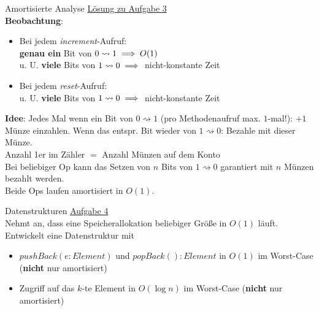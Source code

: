 \begin{frame}{Amortisierte Analyse}
	\underline{Lösung zu Aufgabe 3} \\
	\textbf{Beobachtung}: 
	\begin{itemize}
		\item Bei jedem \emph{increment}-Aufruf: \\
			  \textbf{genau ein} Bit von $0 \rightsquigarrow 1 \Impl O(1)$ \\
			  u. U. \textbf{viele} Bits von $1 \rightsquigarrow 0 \Impl$ nicht-konstante Zeit
		\pause
		\item Bei jedem \emph{reset}-Aufruf: \\
			  u. U. \textbf{viele} Bits von $1 \rightsquigarrow 0 \Impl$ nicht-konstante Zeit
	\end{itemize}
	\pause
	\textbf{Idee}: Jedes Mal wenn ein Bit von $0 \rightsquigarrow 1$ (pro Methodenaufruf max. $1$-mal!): $+1$ Münze einzahlen. Wenn das entspr. Bit wieder von $1 \rightsquigarrow 0$: Bezahle mit dieser Münze. \\
	\pause
	\impl Anzahl 1er im Zähler $=$ Anzahl Münzen auf dem Konto \\
	\pause
	\impl Bei beliebiger Op kann das Setzen von $n$ Bits von $1 \rightsquigarrow 0$ garantiert mit $n$ Münzen bezahlt werden. \\
	\pause
	\impl Beide Ops laufen amortisiert in $O(1)$.
\end{frame}



\begin{frame}{Datenstrukturen}
	\underline{Aufgabe 4} \\
	Nehmt an, dass eine Speicherallokation beliebiger Größe in $O(1)$ läuft. Entwickelt eine Datenstruktur mit
	\begin{itemize}
		\item $pushBack(e : Element)$ und $popBack() : Element$ in $O(1)$ im Worst-Case (\textbf{nicht} nur amortisiert)
		\item Zugriff auf das $k$-te Element in $O(\log n)$ im Worst-Case (\textbf{nicht} nur amortisiert)
	\end{itemize}
\end{frame}

